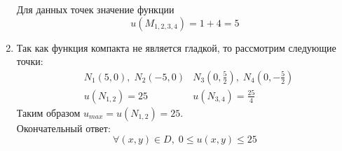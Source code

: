 \begin{Example}
\begin{enumerate}
        Для данных точек значение функции 
        \[
            u(M_{1,2,3,4}) = 1 + 4 = 5
        \]
        \item Так как функция компакта не является гладкой, то рассмотрим следующие точки:
        \begin{align*}
            &N_1(5, 0), \; N_2(-5, 0) &N_3(0, \frac{5}{2}), \; N_4(0, -\frac{5}{2})\\
            &u(N_{1,2}) = 25  &u(N_{3,4}) = \frac{25}{4}
        \end{align*}
        Таким образом $u_{max} = u(N_{1,2}) = 25$.\\
        Окончательный ответ:
        \[
            \forall(x, y) \in D, \; 0 \leqslant u(x, y) \leqslant 25
        \]
    \end{enumerate}
\end{Example}

